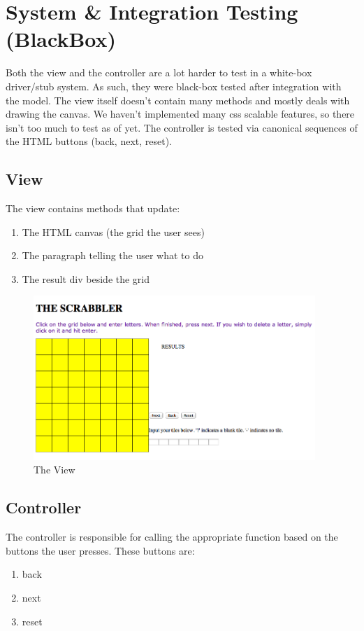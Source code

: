 \documentclass[11pt, oneside]{article}
\begin{document}
\section{System \& Integration Testing (BlackBox)}
Both the view and the controller are a lot harder to test in a white-box driver/stub system.  As such, they were black-box tested after integration with the model.  The view itself doesn't contain many methods and mostly deals with drawing the canvas.  We haven't implemented many css scalable features, so there isn't too much to test as of yet.  The controller is tested via canonical sequences of the HTML buttons (back, next, reset).  

\subsection{View}
The view contains methods that update:
\begin{enumerate}[1)]
	\item The HTML canvas (the grid the user sees)
	\item The paragraph telling the user what to do
	\item The result div beside the grid
\end{enumerate}


\begin{figure}[hl]
\caption{The View}
\includegraphics[width=0.95\textwidth]{view.png}
\end{figure}




\subsection{Controller}
The controller is responsible for calling the appropriate function based on the buttons the user presses.  These buttons are:
\begin{enumerate}[1)]
	\item back
	\item next
	\item reset
\end{enumerate}
\end{document}
